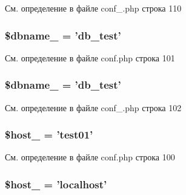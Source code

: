См. определение в файле conf\-\_\-.\-php строка 110

\hypertarget{group___d_b__2_gae40cd9ac0cdd9542398e94e75a970c0c}{
\subsubsection[{\$dbname\-\_\-2}]{\setlength{\rightskip}{0pt plus 5cm}\$dbname\-\_ = 'db\-\_\-test'}}\label{group___d_b__2_gae40cd9ac0cdd9542398e94e75a970c0c}


См. определение в файле conf.\-php строка 101

\hypertarget{group___d_b__2_gae40cd9ac0cdd9542398e94e75a970c0c}{
\subsubsection[{\$dbname\-\_\-2}]{\setlength{\rightskip}{0pt plus 5cm}\$dbname\-\_ = 'db\-\_\-test'}}\label{group___d_b__2_gae40cd9ac0cdd9542398e94e75a970c0c}


См. определение в файле conf\-\_\-.\-php строка 102

\hypertarget{group___d_b__2_ga1fca5ca6a998917bdf494cfd985b6025}{
\subsubsection[{\$host\-\_\-2}]{\setlength{\rightskip}{0pt plus 5cm}\$host\-\_ = 'test01'}}\label{group___d_b__2_ga1fca5ca6a998917bdf494cfd985b6025}


См. определение в файле conf.\-php строка 100

\hypertarget{group___d_b__2_ga1fca5ca6a998917bdf494cfd985b6025}{
\subsubsection[{\$host\-\_\-2}]{\setlength{\rightskip}{0pt plus 5cm}\$host\-\_ = 'localhost'}}\label{group___d_b__2_ga1fca5ca6a998917bdf494cfd985b6025}


